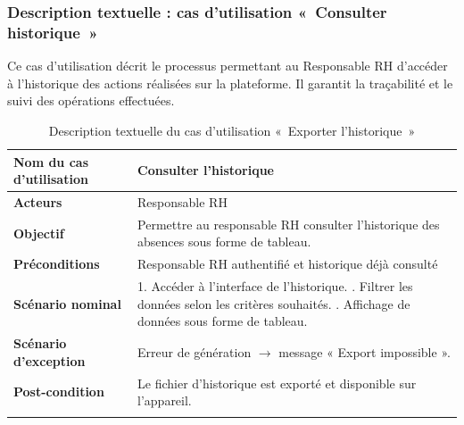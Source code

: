 \subsubsection*{Description textuelle : cas d'utilisation «~Consulter historique~»}
Ce cas d'utilisation décrit le processus permettant au Responsable RH d'accéder à l'historique des actions réalisées sur la plateforme. Il garantit la traçabilité et le suivi des opérations effectuées.
\begin{center}
\begin{longtable}{|p{5cm}|p{9cm}|}
\hline

\textbf{Nom du cas d'utilisation} & Consulter l'historique \\ \hline

\textbf{Acteurs} & Responsable RH \\ \hline

\textbf{Objectif} & Permettre au responsable RH consulter l’historique des absences sous forme de tableau. \\ \hline

\textbf{Préconditions} & Responsable RH authentifié et historique déjà consulté \\ \hline

\textbf{Scénario nominal} &
1. Accéder à l’interface de l’historique. \newline
2. Filtrer les données selon les critères souhaités. \newline
3. Affichage de données sous forme de tableau. \newline

\\ \hline

\textbf{Scénario d'exception} &
Erreur de génération $\rightarrow$ message « Export impossible ». \\ \hline

\textbf{Post-condition} &
Le fichier d’historique est exporté et disponible sur l’appareil. \\ \hline

\caption{Description textuelle du cas d'utilisation «~Exporter l'historique~»}
\end{longtable}
\end{center}

